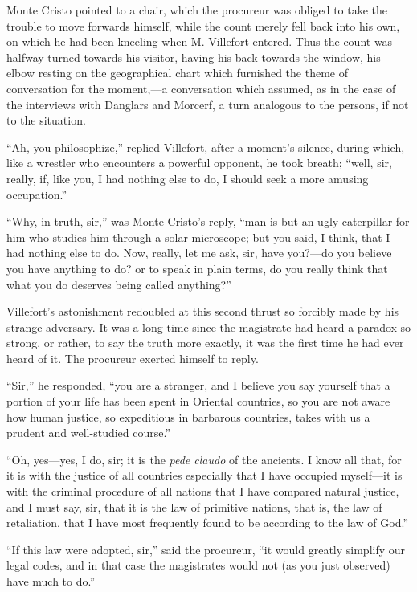 Monte Cristo pointed to a chair, which the procureur was obliged to
take the trouble to move forwards himself, while the count merely fell
back into his own, on which he had been kneeling when M. Villefort
entered. Thus the count was halfway turned towards his visitor, having
his back towards the window, his elbow resting on the geographical
chart which furnished the theme of conversation for the moment,—a
conversation which assumed, as in the case of the interviews with
Danglars and Morcerf, a turn analogous to the persons, if not to the
situation.

“Ah, you philosophize,” replied Villefort, after a moment’s silence,
during which, like a wrestler who encounters a powerful opponent, he
took breath; “well, sir, really, if, like you, I had nothing else to
do, I should seek a more amusing occupation.”

“Why, in truth, sir,” was Monte Cristo’s reply, “man is but an ugly
caterpillar for him who studies him through a solar microscope; but you
said, I think, that I had nothing else to do. Now, really, let me ask,
sir, have you?—do you believe you have anything to do? or to speak in
plain terms, do you really think that what you do deserves being called
anything?”

Villefort’s astonishment redoubled at this second thrust so forcibly
made by his strange adversary. It was a long time since the magistrate
had heard a paradox so strong, or rather, to say the truth more
exactly, it was the first time he had ever heard of it. The procureur
exerted himself to reply.

“Sir,” he responded, “you are a stranger, and I believe you say
yourself that a portion of your life has been spent in Oriental
countries, so you are not aware how human justice, so expeditious in
barbarous countries, takes with us a prudent and well-studied course.”

“Oh, yes—yes, I do, sir; it is the \textit{pede claudo} of the ancients. I
know all that, for it is with the justice of all countries especially
that I have occupied myself—it is with the criminal procedure of all
nations that I have compared natural justice, and I must say, sir, that
it is the law of primitive nations, that is, the law of retaliation,
that I have most frequently found to be according to the law of God.”

“If this law were adopted, sir,” said the procureur, “it would greatly
simplify our legal codes, and in that case the magistrates would not
(as you just observed) have much to do.”

